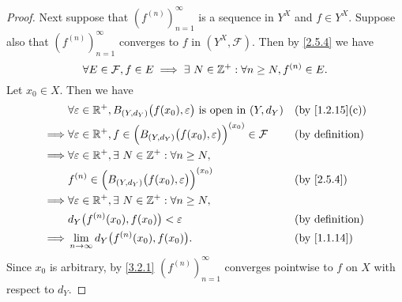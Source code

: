 \begin{proof}
  Next suppose that \((f^{(n)})_{n = 1}^\infty\) is a sequence in \(Y^X\) and \(f \in Y^X\).
  Suppose also that \((f^{(n)})_{n = 1}^\infty\) converges to \(f\) in \((Y^X, \mathcal{F})\).
  Then by \cref{2.5.4} we have
  \[
    \forall E \in \mathcal{F}, f \in E \implies \exists\ N \in \mathbb{Z}^+ : \forall n \geq N, f^{(n)} \in E.
  \]
  Let \(x_0 \in X\).
  Then we have
  \begin{align*}
             & \forall \varepsilon \in \R^+, B_{(Y, d_Y)}\big(f(x_0), \varepsilon\big) \text{ is open in } (Y, d_Y)            &  & \text{(by \cref{1.2.15}(c))} \\
    \implies & \forall \varepsilon \in \R^+, f \in \Big(B_{(Y, d_Y)}\big(f(x_0), \varepsilon\big)\Big)^{(x_0)} \in \mathcal{F} &  & \text{(by definition)}       \\
    \implies & \forall \varepsilon \in \R^+, \exists\ N \in \Z^+ : \forall n \geq N,                                                                             \\
             & f^{(n)} \in \Big(B_{(Y, d_Y)}\big(f(x_0), \varepsilon\big)\Big)^{(x_0)}                                         &  & \by{2.5.4}                   \\
    \implies & \forall \varepsilon \in \R^+, \exists\ N \in \Z^+ : \forall n \geq N,                                                                             \\
             & d_Y\big(f^{(n)}(x_0), f(x_0)\big) < \varepsilon                                                                 &  & \text{(by definition)}       \\
    \implies & \lim_{n \to \infty} d_Y\big(f^{(n)}(x_0), f(x_0)\big).                                                          &  & \text{(by \cref{1.1.14})}
  \end{align*}
  Since \(x_0\) is arbitrary, by \cref{3.2.1} \((f^{(n)})_{n = 1}^\infty\) converges pointwise to \(f\) on \(X\) with respect to \(d_Y\).


\end{proof}
